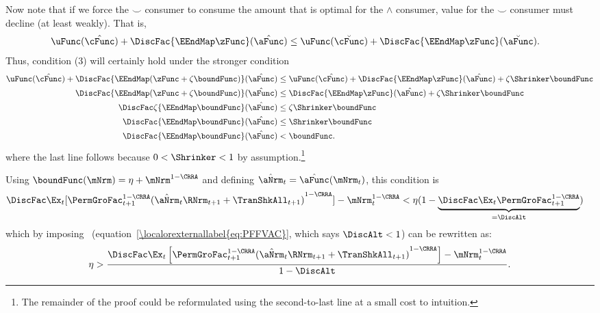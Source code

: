 \documentclass[\econtexRoot/BufferStockTheory]{subfiles}
\begin{document}
Now note that if we force the $\smile$ consumer to consume the amount that is
optimal for the $\wedge$ consumer, value for the $\smile$ consumer must decline (at least weakly).  That is,
\begin{align*}
  \uFunc(\hat{\cFunc})+\DiscFac \{\EEndMap \zFunc \}(\hat{\aFunc})  & \leq \uFunc(\breve{\cFunc})+\DiscFac \{\EEndMap \zFunc \}(\breve{\aFunc})
                                                                      .
\end{align*}
Thus, condition (3) will certainly hold under the stronger condition
\begin{align*}
  \uFunc(\hat{\cFunc})+\DiscFac\{\EEndMap (\zFunc+\zeta \boundFunc) \}(\hat{\aFunc})  & \leq  \uFunc(\hat{\cFunc})+\DiscFac\{\EEndMap \zFunc \}(\hat{\aFunc})  + \zeta \Shrinker \boundFunc
  \\ \DiscFac\{\EEndMap (\zFunc+\zeta \boundFunc) \}(\hat{\aFunc})  & \leq  \DiscFac\{\EEndMap \zFunc  \}(\hat{\aFunc})  + \zeta \Shrinker \boundFunc
  \\ \DiscFac\zeta \{\EEndMap \boundFunc \}(\hat{\aFunc})  & \leq  \zeta \Shrinker \boundFunc
  \\ \DiscFac\{\EEndMap \boundFunc \}(\hat{\aFunc})  & \leq  \Shrinker \boundFunc
  \\ \DiscFac\{\EEndMap \boundFunc \}(\hat{\aFunc})   & < \boundFunc %
                                                        .
\end{align*}
where the last line follows because $0 < \Shrinker < 1$ by assumption.\footnote{The remainder of the proof could be reformulated using the second-to-last line at a small cost to intuition.}

Using $\boundFunc(\mNrm)= \eta + \mNrm^{1-\CRRA}$
and defining $\hat{\aNrm}_{t}=\hat{\aFunc}(\mNrm_{t})$, this condition is
\begin{align*}
  \DiscFac \Ex_{t}[{\PermGroFac}_{t+1}^{1-\CRRA}{(\hat{\aNrm}_{t}\RNrm_{t+1}+\TranShkAll_{t+1})}^{1-\CRRA}]-\mNrm_{t}^{1-\CRRA}  & < \eta(1-\underbrace{\DiscFac\Ex_{t}{\PermGroFac}_{t+1}^{1-\CRRA}}_{=\DiscAlt})
\end{align*}
which by imposing \PFFVAC~(equation~\eqref{\localorexternallabel{eq:PFFVAC}}, which says $\DiscAlt<1$) can be rewritten as:
\begin{equation}\begin{gathered}\begin{aligned}
      \eta>\frac{\DiscFac \Ex_{t}\left[{\PermGroFac}_{t+1}^{1-\CRRA}{(\hat{\aNrm}_{t}\RNrm_{t+1}+\TranShkAll_{t+1})}^{1-\CRRA}\right]-\mNrm_{t}^{1-\CRRA}}{1-\DiscAlt}\label{eq:KeyCondition}.
    \end{aligned}\end{gathered}\end{equation}
\end{document}
